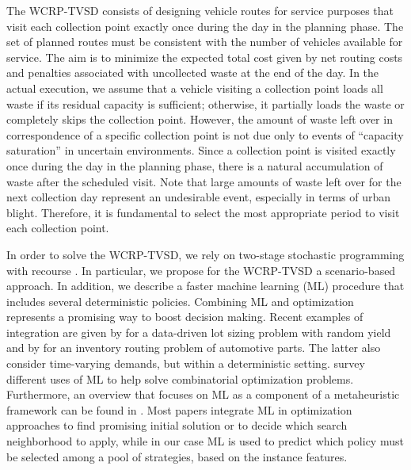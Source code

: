 \documentclass[preprint,11pt,authoryear]{elsarticle}
\begin{document}
The WCRP-TVSD consists of designing vehicle routes for service purposes that visit each collection point exactly once during the day in the planning phase. The set of planned routes must be consistent with the number of vehicles available for service. The aim is to minimize the expected total cost given by net routing costs and penalties associated with uncollected waste at the end of the day.
%
In the actual execution, we assume that a vehicle visiting a collection point loads all waste if its residual capacity is sufficient; otherwise, it partially loads the waste or completely skips the collection point. However, the amount of waste left over in correspondence of a specific collection point is not due only to events of ``capacity saturation'' in uncertain environments. Since a collection point is visited exactly once during the day in the planning phase, there is a natural accumulation of waste after the scheduled visit.
Note that large amounts of waste left over for the next collection day represent an undesirable event, especially in terms of urban blight. Therefore, it is fundamental to select the most appropriate period to visit each collection point.  

In order to solve the WCRP-TVSD, we rely on two-stage stochastic
programming with recourse \citep{Ruszczynski2003}. In particular, we propose for the WCRP-TVSD a scenario-based approach. In addition, we describe a faster machine learning (ML) procedure that includes several deterministic policies. Combining ML and optimization represents a promising way to boost decision making. Recent examples of integration are given by \cite{Bibak2025} for a data-driven lot sizing problem with random yield and by \cite{Wang2025} for an inventory routing problem of automotive parts. The latter also consider time-varying demands, but within a deterministic setting.  
\cite{Bengio2021} survey different uses of ML  to help solve combinatorial optimization problems.
Furthermore, an overview that focuses on ML as a component of a metaheuristic framework can be found in \cite{Karimi2022}. Most papers integrate ML in optimization approaches to find promising initial solution or to decide which search neighborhood to apply, while in our case ML is used to predict which policy must be selected among a pool of strategies, based on the instance features.
\end{document}
